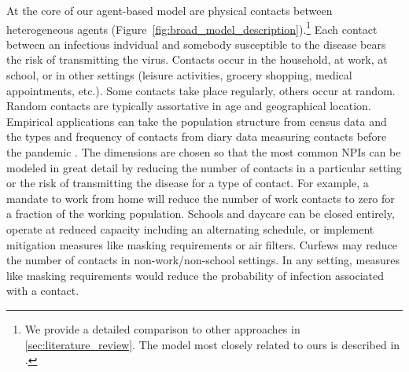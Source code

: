 At the core of our agent-based model are physical contacts between heterogeneous agents
(Figure~\ref{fig:broad_model_description}).\footnote{We provide a detailed comparison to
other approaches in \ref{sec:literature_review}. The model most closely related to ours
is described in \citet{Hinch2020}.} Each contact between an infectious indvidual and
somebody susceptible to the disease bears the risk of transmitting the virus. Contacts
occur in the household, at work, at school, or in other settings (leisure activities,
grocery shopping, medical appointments, etc.). Some contacts take place regularly, others occur at random. Random contacts are
typically assortative in age and geographical location. Empirical applications can take
the population structure from census data and the types and frequency of contacts from
diary data measuring contacts before the pandemic
\citep[e.g.][]{Mossong2008}. The dimensions are
chosen so that the most common NPIs can be modeled in great detail by reducing the
number of contacts in a particular setting or the risk of transmitting the disease for a
type of contact. For example, a mandate to work from home will reduce the number of work
contacts to zero for a fraction of the working population. Schools and daycare can be
closed entirely, operate at reduced capacity including an alternating schedule, or
implement mitigation measures like masking requirements or air
filters. Curfews
may reduce the number of contacts in non-work/non-school settings. In any setting,
measures like masking requirements would reduce the probability of infection associated
with a contact.




